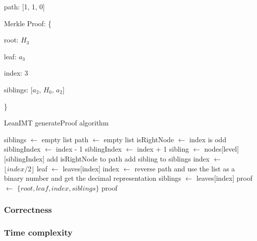 \documentclass{article}
\begin{document}
path: [1, 1, 0]

Merkle Proof: \{

root: $H_3$

leaf: $a_3$

index: 3

siblings: [$a_2$, $H_0$, $a_2$]

\}



\begin{algorithm}[H]
    \caption{LeanIMT generateProof algorithm}\label{generateProof}
    \begin{algorithmic}[1]
        \State siblings $\gets$ empty list 
        \State path $\gets$ empty list 
        \State isRightNode $\gets$ index is odd
         
        \State siblingIndex $\gets$ index - 1
        \Else {}
        \State siblingIndex $\gets$ index + 1
        \EndIf
        \State sibling $\gets$ nodes[level][siblingIndex]
        \State add isRightNode to path
        \State add sibling to siblings
        \EndIf
        \State index $\gets$ $\lfloor index/2 \rfloor$ 
        \EndFor
        \State leaf $\gets$ leaves[index]
        \State index $\gets$ reverse path and use the list as a binary number and get the decimal representation
        \State siblings $\gets$ leaves[index]
        \State proof $\gets$ $\{root, leaf , index, siblings \}$
        \State \Return proof
        \EndProcedure
    \end{algorithmic}
\end{algorithm}



\subsubsection{Correctness}



\subsubsection{Time complexity}
\end{document}
